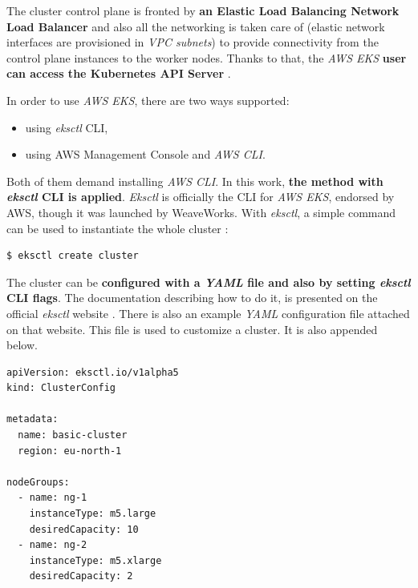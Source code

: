 The cluster control plane is fronted by \textbf{an Elastic Load Balancing Network Load Balancer} and also all the networking is taken care of (elastic network interfaces are provisioned in \textit{VPC subnets}) to provide connectivity from the control plane instances to the worker nodes. Thanks to that, the \textit{AWS EKS} \textbf{user can access the Kubernetes API Server} \cite{eks-clusters}.

In order to use \textit{AWS EKS}, there are two ways supported:
\begin{itemize}
\item using \textit{eksctl} CLI,
\item using AWS Management Console and \textit{AWS CLI}.
\end{itemize}

Both of them demand installing \textit{AWS CLI}. In this work, \textbf{the method with \textit{eksctl} CLI is applied}. \textit{Eksctl} is officially the CLI for \textit{AWS EKS}, endorsed by AWS, though it was launched by WeaveWorks. With \textit{eksctl}, a simple command can be used to instantiate the whole cluster \cite{eks-cli-official}:
\begin{lstlisting}[basicstyle=\scriptsize,caption={A command of \textit{eksctl} CLI tool used to create a Kubernetes cluster},captionpos=b,language=Bash,xleftmargin=1cm]
$ eksctl create cluster
\end{lstlisting}

The cluster can be \textbf{configured with a \textit{YAML} file and also by setting \textit{eksctl} CLI flags}. The documentation describing how to do it, is presented on the official \textit{eksctl} website \cite{eksctl}. There is also an example \textit{YAML} configuration file attached on that website. This file is used to customize a cluster. It is also appended below.

\begin{lstlisting}[basicstyle=\scriptsize,caption={An example \textit{YAML} file used to customize a Kubernetes cluster created with \textit{eksctl} CLI tool \cite{eksctl}},captionpos=b,language=Bash,xleftmargin=1cm]
apiVersion: eksctl.io/v1alpha5
kind: ClusterConfig

metadata:
  name: basic-cluster
  region: eu-north-1

nodeGroups:
  - name: ng-1
    instanceType: m5.large
    desiredCapacity: 10
  - name: ng-2
    instanceType: m5.xlarge
    desiredCapacity: 2
\end{lstlisting}

